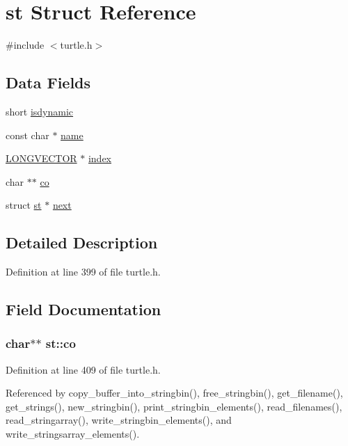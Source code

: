 \hypertarget{structst}{\section{st Struct Reference}
\label{structst}
}


{\ttfamily \#include $<$turtle.\-h$>$}

\subsection*{Data Fields}
\begin{DoxyCompactItemize}
\item 
short \hyperlink{structst_afadfdd55b2e3b0f23568465d8d41ea8d}{isdynamic}
\item 
const char $\ast$ \hyperlink{structst_ac0ecdbb00792dccee8cb6d6e6fd49227}{name}
\item 
\hyperlink{struct_l_o_n_g_v_e_c_t_o_r}{L\-O\-N\-G\-V\-E\-C\-T\-O\-R} $\ast$ \hyperlink{structst_aefccba712a02de708a1185876a342e3e}{index}
\item 
char $\ast$$\ast$ \hyperlink{structst_af03381dd8b4fc936caed6ce7c29e0e55}{co}
\item 
struct \hyperlink{structst}{st} $\ast$ \hyperlink{structst_a901e9b8dd62788b381fc7e626ffda41e}{next}
\end{DoxyCompactItemize}


\subsection{Detailed Description}


Definition at line 399 of file turtle.\-h.



\subsection{Field Documentation}
\hypertarget{structst_af03381dd8b4fc936caed6ce7c29e0e55}{
\subsubsection[{co}]{\setlength{\rightskip}{0pt plus 5cm}char$\ast$$\ast$ st\-::co}}\label{structst_af03381dd8b4fc936caed6ce7c29e0e55}


Definition at line 409 of file turtle.\-h.



Referenced by copy\-\_\-buffer\-\_\-into\-\_\-stringbin(), free\-\_\-stringbin(), get\-\_\-filename(), get\-\_\-strings(), new\-\_\-stringbin(), print\-\_\-stringbin\-\_\-elements(), read\-\_\-filenames(), read\-\_\-stringarray(), write\-\_\-stringbin\-\_\-elements(), and write\-\_\-stringsarray\-\_\-elements().


